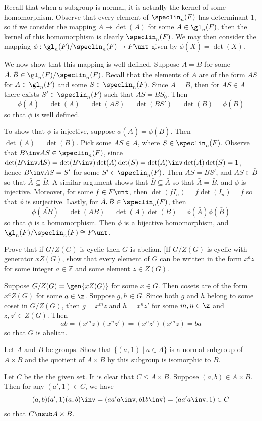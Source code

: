 \begin{problems}
\begin{sol}
        Recall that when a subgroup is normal, it is actually the kernel of some homomorphism. Observe that every element of $\speclin_n(F)$ has determinant 1, so if we consider the mapping $A \mapsto \det(A)$ for some $A \in \gl_n(F)$, then the kernel of this homomorphism is clearly $\speclin_n(F)$. We may then consider the mapping $\phi : \gl_n(F)/\speclin_n(F) \to F\unt$ given by $\phi(\bar X) = \det(X)$.

        We now show that this mapping is well defined. Suppose $\bar A = \bar B$ for some $\bar A, \bar B \in \gl_n(F)/\speclin_n(F)$. Recall that the elements of $\bar A$ are of the form $AS$ for $A \in \gl_n(F)$ and some $S \in \speclin_n(F)$. Since $\bar A = \bar B$, then for $AS \in \bar A$ there exists $S' \in \speclin_n(F)$ such that $AS = BS_0$. Then
        \[\phi(\bar A) = \det(A) = \det(AS) = \det(BS') = \det(B) = \phi(\bar B)\]
        so that $\phi$ is well defined.
        
        To show that $\phi$ is injective, suppose $\phi(\bar A) = \phi(\bar B)$. Then $\det(A) = \det(B)$. Pick some $AS \in \bar A$, where $S \in \speclin_n(F)$. Observe that $B\inv AS \in \speclin_n(F)$, since $\det(B\inv AS) = \det(B\inv)\det(A)\det(S) = \det(A)\inv\det(A)\det(S) = 1$, hence $B\inv AS = S'$ for some $S' \in \speclin_n(F)$. Then $AS = BS'$, and $AS \in \bar B$ so that $\bar A \subseteq \bar B$. A similar argument shows that $\bar B \subseteq \bar A$ so that $\bar A = \bar B$, and $\phi$ is injective. Moreover, for some $f \in F\unt$, then $\det(fI_n) = f\det(I_n) = f$ so that $\phi$ is surjective. Lastly, for $\bar A, \bar B \in \speclin_n(F)$, then 
        \[\phi(\bar{AB}) = \det(AB) = \det(A)\det(B) = \phi(\bar A)\phi(\bar B)\]
        so that $\phi$ is a homomorphism. Then $\phi$ is a bijective homomorphism, and $\gl_n(F)/\speclin_n(F) \cong F\unt$. 
    \end{sol}
    \item \label{ex3.1.36} Prove that if $G/Z(G)$ is cyclic then $G$ is abelian. [If $G/Z(G)$ is cyclic with generator $xZ(G)$, show that every element of $G$ can be written in the form $x^a z$ for some integer $a \in \mathbb{Z}$ and some element $z \in Z(G)$.]
    \begin{sol}
        Suppose $G/Z(G) = \gen{xZ(G)}$ for some $x \in G$. Then cosets are of the form $x^aZ(G)$ for some $a \in \z$. Suppose $g, h \in G$. Since both $g$ and $h$ belong to some coset in $G/Z(G)$, then $g = x^mz$ and $h = x^nz'$ for some $m, n \in \z$ and $z, z' \in Z(G)$. Then
        \[ab = (x^mz)(x^nz') = (x^nz')(x^mz) = ba\]
        so that $G$ is abelian.
    \end{sol}
    \item Let $A$ and $B$ be groups. Show that $\{(a,1) \mid a \in A\}$ is a normal subgroup of $A \times B$ and the quotient of $A \times B$ by this subgroup is isomorphic to $B$.
    \begin{sol}
        Let $C$ be the the given set. It is clear that $C \leq A \times B$. Suppose $(a, b) \in A \times B$. Then for any $(a', 1) \in C$, we have
        \[(a, b)(a', 1)(a, b)\inv = (aa'a\inv, b1b\inv) = (aa'a\inv, 1) \in C\]
        so that $C \nsub A \times B$.


\end{sol}
\end{problems}
